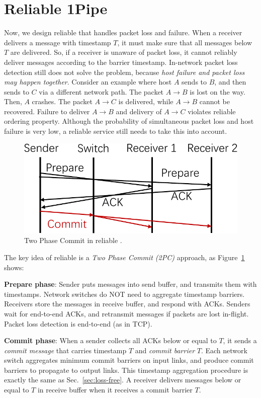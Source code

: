 \section{Reliable 1Pipe}
\label{sec:reliable}

Now, we design reliable \sys{} that handles packet loss and failure.
When a receiver delivers a message with timestamp $T$, it must make sure that all messages below $T$ are delivered.
So, if a receiver is unaware of packet loss, it cannot reliably deliver messages according to the barrier timestamp.
In-network packet loss detection still does not solve the problem, because \emph{host failure and packet loss may happen together}.
Consider an example where host $A$ sends to $B$, and then sends to $C$ via a different network path. The packet $A \rightarrow B$ is lost on the way. Then, $A$ crashes. The packet $A \rightarrow C$ is delivered, while $A \rightarrow B$ cannot be recovered. Failure to deliver $A \rightarrow B$ and delivery of $A \rightarrow C$ violates reliable ordering property.
Although the probability of simultaneous packet loss and host failure is very low, a reliable service still needs to take this into account.


\begin{figure}[t]
\centering
	\includegraphics[width=.3\textwidth]{images/2PC.pdf}
	\vspace{-0.5em}
	\caption{Two Phase Commit in reliable \sys{}.}
	\label{fig:2PC}
	\vspace{-1.5em}
\end{figure}

The key idea of reliable \sys{} is a \emph{Two Phase Commit (2PC)} approach, as Figure~\ref{fig:2PC} shows:

\begin{ecompact}
\item \textbf{Prepare phase}: Sender puts messages into send buffer, and transmits them with timestamps. Network switches do NOT need to aggregate timestamp barriers. Receivers store the messages in receive buffer, and respond with ACKs. Senders wait for end-to-end ACKs, and retransmit messages if packets are lost in-flight. Packet loss detection is end-to-end (as in TCP).
\item \textbf{Commit phase}: When a sender collects all ACKs below or equal to $T$, it sends a \emph{commit message} that carries timestamp $T$ and \emph{commit barrier} $T$. Each network switch aggregates minimum commit barriers on input links, and produce commit barriers to propagate to output links. This timestamp aggregation procedure is exactly the same as Sec.~\ref{sec:loss-free}. A receiver delivers messages below or equal to $T$ in receive buffer when it receives a commit barrier $T$.
\end{ecompact}



